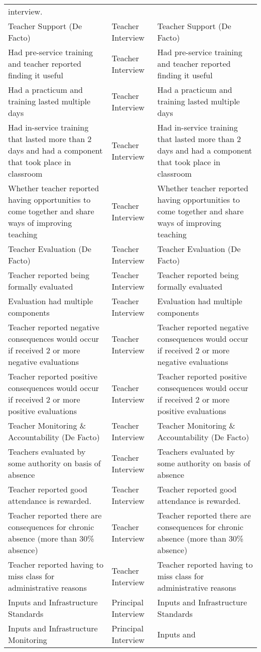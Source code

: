 \documentclass[]{article}
\begin{document}
\begin{longtable}[]{@{}lll@{}}
interview.\tabularnewline
Teacher Support (De Facto) & Teacher Interview & Teacher Support (De
Facto)\tabularnewline
Had pre-service training and teacher reported finding it useful &
Teacher Interview & Had pre-service training and teacher reported
finding it useful\tabularnewline
Had a practicum and training lasted multiple days & Teacher Interview &
Had a practicum and training lasted multiple days\tabularnewline
Had in-service training that lasted more than 2 days and had a component
that took place in classroom & Teacher Interview & Had in-service
training that lasted more than 2 days and had a component that took
place in classroom\tabularnewline
Whether teacher reported having opportunities to come together and share
ways of improving teaching & Teacher Interview & Whether teacher
reported having opportunities to come together and share ways of
improving teaching\tabularnewline
Teacher Evaluation (De Facto) & Teacher Interview & Teacher Evaluation
(De Facto)\tabularnewline
Teacher reported being formally evaluated & Teacher Interview & Teacher
reported being formally evaluated\tabularnewline
Evaluation had multiple components & Teacher Interview & Evaluation had
multiple components\tabularnewline
Teacher reported negative consequences would occur if received 2 or more
negative evaluations & Teacher Interview & Teacher reported negative
consequences would occur if received 2 or more negative
evaluations\tabularnewline
Teacher reported positive consequences would occur if received 2 or more
positive evaluations & Teacher Interview & Teacher reported positive
consequences would occur if received 2 or more positive
evaluations\tabularnewline
Teacher Monitoring \& Accountability (De Facto) & Teacher Interview &
Teacher Monitoring \& Accountability (De Facto)\tabularnewline
Teachers evaluated by some authority on basis of absence & Teacher
Interview & Teachers evaluated by some authority on basis of
absence\tabularnewline
Teacher reported good attendance is rewarded. & Teacher Interview &
Teacher reported good attendance is rewarded.\tabularnewline
Teacher reported there are consequences for chronic absence (more than
30\% absence) & Teacher Interview & Teacher reported there are
consequences for chronic absence (more than 30\% absence)\tabularnewline
Teacher reported having to miss class for administrative reasons &
Teacher Interview & Teacher reported having to miss class for
administrative reasons\tabularnewline
Inputs and Infrastructure Standards & Principal Interview & Inputs and
Infrastructure Standards\tabularnewline
Inputs and Infrastructure Monitoring & Principal Interview & Inputs and

\end{longtable}
\end{document}
